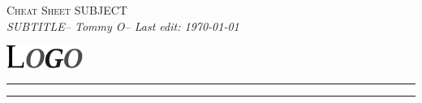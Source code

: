 \documentclass[11pt, a4paper]{article}
\newcommand{\Title}{Cheat Sheet SUBJECT}
\newcommand{\Subtitle}{SUBTITLE}
\newcommand{\Author}{Tommy O}
\begin{document}
	\pagestyle{empty}
\noindent
\begin{minipage}[t]{.75\textwidth}
	\raggedright
	{\huge \scshape \Title} \\
	{\small \itshape \Subtitle \hspace{1ex}-- \Author \hspace{1ex}-- {\footnotesize Last edit: \today}}
\end{minipage}%
\begin{minipage}[t]{.25\textwidth}
	\raggedleft
	\includegraphics[width=2.5cm]{figs/logo.pdf}
\end{minipage} 
\vspace{0.1em} 
\hrule\hrule

\end{document}
